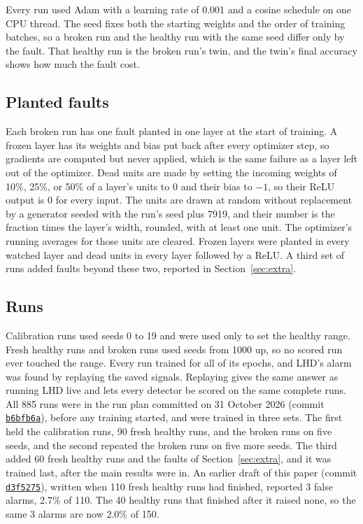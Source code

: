 \documentclass[11pt]{article}
\begin{document}
Every run used Adam with a learning rate of 0.001 and a cosine schedule on one CPU thread. The seed fixes both the starting weights and the order of training batches, so a broken run and the healthy run with the same seed differ only by the fault. That healthy run is the broken run's twin, and the twin's final accuracy shows how much the fault cost.

\subsection{Planted faults}

Each broken run has one fault planted in one layer at the start of training. A frozen layer has its weights and bias put back after every optimizer step, so gradients are computed but never applied, which is the same failure as a layer left out of the optimizer. Dead units are made by setting the incoming weights of 10\%, 25\%, or 50\% of a layer's units to 0 and their bias to $-1$, so their ReLU output is 0 for every input. The units are drawn at random without replacement by a generator seeded with the run's seed plus 7919, and their number is the fraction times the layer's width, rounded, with at least one unit. The optimizer's running averages for those units are cleared. Frozen layers were planted in every watched layer and dead units in every layer followed by a ReLU. A third set of runs added faults beyond these two, reported in Section~\ref{sec:extra}.

\subsection{Runs}
\label{sec:runs}

Calibration runs used seeds 0 to 19 and were used only to set the healthy range. Fresh healthy runs and broken runs used seeds from 1000 up, so no scored run ever touched the range. Every run trained for all of its epochs, and LHD's alarm was found by replaying the saved signals. Replaying gives the same answer as running LHD live and lets every detector be scored on the same complete runs. All 885 runs were in the run plan committed on 31 October 2026 (commit \href{https://github.com/sohan-bhat/lhd/commit/b6bfb6a}{\texttt{b6bfb6a}}), before any training started, and were trained in three sets. The first held the calibration runs, 90 fresh healthy runs, and the broken runs on five seeds, and the second repeated the broken runs on five more seeds. The third added 60 fresh healthy runs and the faults of Section~\ref{sec:extra}, and it was trained last, after the main results were in. An earlier draft of this paper (commit \href{https://github.com/sohan-bhat/lhd/commit/d3f5275}{\texttt{d3f5275}}), written when 110 fresh healthy runs had finished, reported 3 false alarms, 2.7\% of 110. The 40 healthy runs that finished after it raised none, so the same 3 alarms are now 2.0\% of 150.
\end{document}
